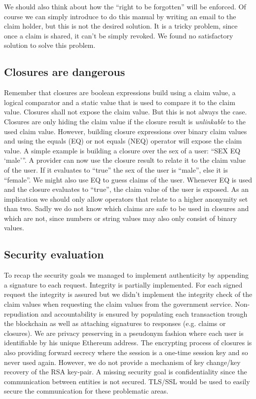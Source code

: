 We should also think about how the “right to be forgotten” will be enforced. Of course we can simply introduce to do this manual by writing an email to the claim holder, but this is not the desired solution. It is a tricky problem, since once a claim is shared, it can’t be simply revoked. We found no satisfactory solution to solve this problem.

\subsection{Closures are dangerous}
Remember that closures are boolean expressions build using a claim value, a logical comparator and a static value that is used to compare it to the claim value. Closures shall not expose the claim value. But this is not always the case. Closures are only hiding the claim value if the closure result is \textit{unlinkable} to the used claim value. However, building closure expressions over binary claim values and using the equals (EQ) or not equals (NEQ) operator will expose the claim value. A simple example is building a closure over the sex of a user: “SEX EQ ‘male’”. A provider can now use the closure result to relate it to the claim value of the user. If it evaluates to “true” the sex of the user is “male”, else it is “female”. We might also use EQ to guess claims of the user. Whenever EQ is used and the closure evaluates to “true”, the claim value of the user is exposed. As an implication we should only allow operators that relate to a higher anonymity set than two. Sadly we do not know which claims are safe to be used in closures and which are not, since numbers or string values may also only consist of binary values.

\subsection{Security evaluation}
\label{sec:securityEvaluation}
To recap the security goals we managed to implement authenticity by appending a signature to each request. Integrity is partially implemented. For each signed request the integrity is assured but we didn’t implement the integrity check of the claim values when requesting the claim values from the government service. Non-repudiation and accountability is ensured by populating each transaction trough the blockchain as well as attaching signatures to responses (e.g. claims or closures). We are privacy preserving in a pseudonym fashion where each user is identifiable by his unique Ethereum address. The encrypting process of closures is also providing forward secrecy where the session is a one-time session key and so never used again. However, we do not provide a mechanism of key change/key recovery of the RSA key-pair. A missing security goal is confidentiality since the communication between entities is not secured. TLS/SSL would be used to easily secure the communication for these problematic areas.

